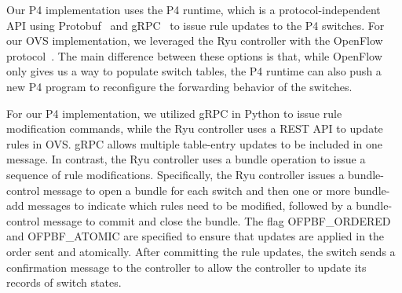 Our P4 implementation uses the P4 runtime, which is a
protocol-independent API using Protobuf~\cite{protoBuf} and gRPC~\cite{grpc} to issue rule updates to the P4 switches.
For our OVS implementation, we leveraged the Ryu controller
with the OpenFlow protocol~\cite{OpenFlowSpec}. The main difference
between these options is that, while OpenFlow only gives us a
way to populate switch tables, the P4 runtime can also push a new P4
program to reconfigure the forwarding behavior of the switches.

For our P4 implementation, we utilized gRPC in Python to issue rule
modification commands, while the Ryu controller uses a REST API to
update rules in OVS. gRPC allows multiple table-entry updates
to be included in one message.  In contrast, the Ryu controller uses a
bundle operation to issue a sequence of rule modifications.
Specifically, the Ryu controller issues a bundle-control message to
open a bundle for each switch and then one or more bundle-add messages
to indicate which rules need to be modified, followed by a
bundle-control message to commit and close the bundle. The flag
OFPBF\_ORDERED and OFPBF\_ATOMIC are specified to ensure that updates
are applied in the order sent and atomically.  After committing the
rule updates, the switch sends a confirmation message to the
controller to allow the controller to update its records of switch
states.

\iffalse
\subsection{flow-based Algorithm Execution}
To execute our algorithm, the controller needs to

The controller will keep the path information of each packet. To save the
memory, we define flow \flowID{} as a class of packets traversing a single
specific path \pathID{\flowID{}}. Specifically, the controller can store a
number of flow-path pairs $(\flowID{}, \pathID{\flowID{}})$ where $\flowID{}$
is represented by a sequence of bits (wildcard expression). For example, if the
match fields of rules only take into account the source and destination IP address,
we can use a(multiple) 64-bit string(s) to indicate a flow \flowID{} (consider
a 32-bit IPv4 address). When the controller receives the %
it will first search for the current paths of flows covered by
\flowSpec. This can be done by transforming the \flowSpec into wildcard expression
and computing the intersection for \flowSpec and flows $\flowID{}$ stored in the
controller. For example, if \flowSpec is $10xx1$ ($x$ indicates a wildcard) and
we have the current paths of flows $10x0x$ and $10x1x$ respectively.
We can obtain two wildcard-path pairs, $(10x01, \pathID{10x01})$ and
$(10x11, \pathID{10x11})$, because $10x0x \cap 10xx1 = 10x01$ and
$10x1x \cap 10xx1 = 10x11$. Here we use the Header Space Algebra
defined in~\cite{Header} to execute the set operations on wildcard
expressions. After this operation, the controller will obtain
a sequence of flows $(\flowID{1}, \flowID{2}, ...)$ and their corresponding
current path $(\oldPath{\flowID{1}}, \oldPath{\flowID{2}}, ...)$.
The controller will update the path information of each flow after each %
\fi

